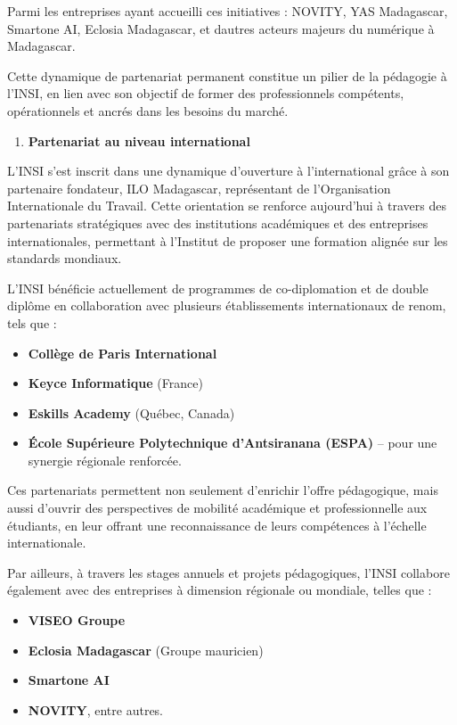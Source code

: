 Parmi les entreprises ayant accueilli ces initiatives : NOVITY, YAS
Madagascar, Smartone AI, Eclosia Madagascar, et d\textquotesingle autres
acteurs majeurs du numérique à Madagascar.

Cette dynamique de partenariat permanent constitue un pilier de la
pédagogie à l'INSI, en lien avec son objectif de former des
professionnels compétents, opérationnels et ancrés dans les besoins du
marché.

\begin{enumerate}
	\def\labelenumi{\arabic{enumi}.}
	\setcounter{enumi}{1}
	\item
	\textbf{Partenariat au niveau international}
\end{enumerate}

L'INSI s'est inscrit dans une dynamique d'ouverture à l'international
grâce à son partenaire fondateur, ILO Madagascar, représentant
de l'Organisation Internationale du Travail. Cette orientation se
renforce aujourd'hui à travers des partenariats stratégiques
	avec des institutions académiques et des entreprises internationales,
permettant à l'Institut de proposer une formation alignée sur les
standards mondiaux.

L'INSI bénéficie actuellement de programmes de co-diplomation et
	de double diplôme en collaboration avec plusieurs établissements
internationaux de renom, tels que :

\begin{itemize}
	\item
	\textbf{Collège de Paris International}
	\item
	\textbf{Keyce Informatique} (France)
	\item
	\textbf{Eskills Academy} (Québec, Canada)
	\item
	\textbf{École Supérieure Polytechnique d'Antsiranana (ESPA)} -- pour
	une synergie régionale renforcée.
\end{itemize}

Ces partenariats permettent non seulement d'enrichir l'offre
pédagogique, mais aussi d'ouvrir des perspectives de mobilité
	académique et professionnelle aux étudiants, en leur offrant
une reconnaissance de leurs compétences à l'échelle internationale.

Par ailleurs, à travers les stages annuels et projets
	pédagogiques, l'INSI collabore également avec des entreprises à
dimension régionale ou mondiale, telles que :

\begin{itemize}
	\item
	\textbf{VISEO Groupe}
	\item
	\textbf{Eclosia Madagascar} (Groupe mauricien)
	\item
	\textbf{Smartone AI}
	\item
	\textbf{NOVITY}, entre autres.
\end{itemize}

